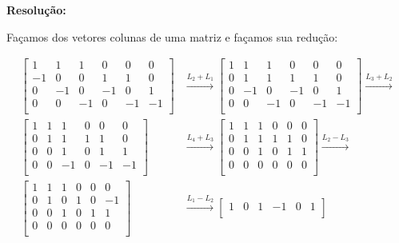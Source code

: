 \documentclass[leqno]{article}
\begin{document}
\begin{enumerate}
    \textbf{Resolução:}
    
    Façamos dos vetores colunas de uma matriz e façamos sua redução:
    
    \begin{align*}
        \begin{bmatrix}
        1 & 1 & 1 & 0 & 0 & 0\\
        -1 & 0 & 0 & 1 & 1 & 0\\
        0 & -1 & 0 & -1 & 0 & 1\\
        0 & 0 & -1 & 0 & -1 & -1\\
        \end{bmatrix}&\xrightarrow{L_2+L_1}\begin{bmatrix}
        1 & 1 & 1 & 0 & 0 & 0\\
        0 & 1 & 1 & 1 & 1 & 0\\
        0 & -1 & 0 & -1 & 0 & 1\\
        0 & 0 & -1 & 0 & -1 & -1\\
        \end{bmatrix}\xrightarrow{L_3+L_2}\\\begin{bmatrix}
        1 & 1 & 1 & 0 & 0 & 0\\
        0 & 1 & 1 & 1 & 1 & 0\\
        0 & 0 & 1 & 0 & 1 & 1\\
        0 & 0 & -1 & 0 & -1 & -1\\
        \end{bmatrix}&\xrightarrow{L_4+L_3}\begin{bmatrix}
        1 & 1 & 1 & 0 & 0 & 0\\
        0 & 1 & 1 & 1 & 1 & 0\\
        0 & 0 & 1 & 0 & 1 & 1\\
        0 & 0 & 0 & 0 & 0 & 0\\
        \end{bmatrix}\xrightarrow{L_2-L_3}\\\begin{bmatrix}
        1 & 1 & 1 & 0 & 0 & 0\\
        0 & 1 & 0 & 1 & 0 & -1\\
        0 & 0 & 1 & 0 & 1 & 1\\
        0 & 0 & 0 & 0 & 0 & 0\\
        \end{bmatrix}&\xrightarrow{L_1-L_2}\begin{bmatrix}
        1 & 0 & 1 & -1 & 0 & 1\\

\end{bmatrix}
\end{align*}
\end{enumerate}
\end{document}
